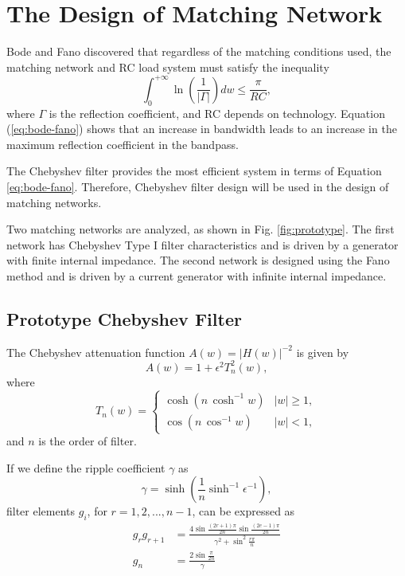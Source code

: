 \documentclass[lettersize,journal]{IEEEtran}
\begin{document}
\section{The Design of Matching Network}

Bode and Fano discovered that regardless of the matching
conditions used, the matching network and RC load system
must satisfy the inequality
%
\begin{equation}
	\label{eq:bode-fano}
	\int_0^{+\infty} \ln \left( \frac{1}{|\Gamma|} \right) d w \leq \frac{\pi}{R C},
\end{equation}
%
where $\Gamma$ is the reflection coefficient, and RC depends on
technology. Equation (\ref{eq:bode-fano}) shows that an increase in bandwidth
leads to an increase in the maximum reflection coefficient in
the bandpass.

The Chebyshev filter provides the most efficient system in
terms of Equation \ref{eq:bode-fano}. Therefore, Chebyshev filter design will
be used in the design of matching networks.

Two matching networks are analyzed, as shown in Fig. \ref{fig:prototype}.
The first network has Chebyshev Type I filter characteristics
and is driven by a generator with finite internal impedance.
The second network is designed using the Fano method and is
driven by a current generator with infinite internal impedance.

\subsection{Prototype Chebyshev Filter}

The Chebyshev attenuation function $A(w) = |H(w)|^{-2}$ is given by
%
\begin{equation}
	\label{eq:cheb_funct}
	A(w) = 1 + \epsilon^2 T_n^2(w),
\end{equation}
%
where
%
\begin{equation}
	T_n(w) = 
     \begin{cases}
        \cosh \left( n \, \cosh^{-1} w \right) & |w| \geq 1, \\
        \cos \left( n \, \cos^{-1} w \right) & |w| < 1,
     \end{cases}
\end{equation}
%
and $n$ is the order of filter.

If we define the ripple coefficient $\gamma$ as
%
\begin{equation}
	\label{eq:gamma_def}
	\gamma = \sinh \left( \frac{1}{n} \sinh^{-1} \epsilon^{-1} \right),
\end{equation}
%
filter elements $g_i$, for $r = 1, 2, ..., n - 1$, can be expressed as 
%
\begin{subequations} \label{eq:gi_all}
    \begin{align}
       g_r g_{r + 1} &= \frac{4 \sin \frac{(2 r + 1) \pi}{2n} \sin \frac{(2e - 1) \pi}{2n}}{\gamma^2 + \sin^2 \frac{r \pi}{n}} \label{eq:gi_grgr+1} \\
        g_n &= \frac{2 \sin \frac{\pi}{2n}}{\gamma} \label{eq:gi_gn} 
    \end{align}
\end{subequations}
\end{document}
